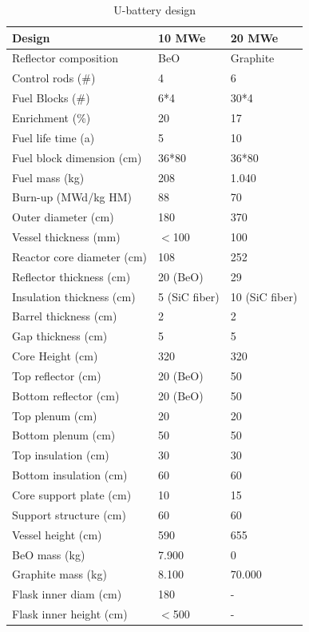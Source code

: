 \begin{table} [htbp]
\begin{center}
\caption{U-battery design}
\label{Utable}
\begin{tabular}{l l l}
\hline 
Design 		&10 MWe &20 MWe\\ 
\hline 
Reflector composition & BeO          &  Graphite\\
Control rods (\#) & 4                        &  6 \\
Fuel Blocks (\#) & 6*4                     & 30*4 \\
Enrichment (\%) & 20                      & 17  \\
Fuel life time (a)&  5                       & 10  \\
Fuel block dimension (cm) & 36*80 &  36*80 \\
Fuel mass (kg) & 208                     &   1.040\\
Burn-up (MWd/kg HM)  & 88           &   70 \\
\hline 
Outer diameter (cm)             &   180  &  370   \\
Vessel thickness (mm)        &   $<$100       & 100   \\
Reactor core diameter (cm)  &   108     &  252  \\
Reflector thickness (cm)      &   20 (BeO)    &29    \\
Insulation thickness (cm)     &   5 (SiC fiber)     & 10 (SiC fiber)   \\
Barrel thickness (cm)           &    2   & 2    \\
Gap thickness (cm)             &    5  &  5  \\
\hline 
Core Height (cm)          & 320         & 320 \\
Top reflector (cm)         &  20 (BeO)&50  \\
Bottom reflector (cm)    &  20 (BeO)& 50 \\
Top plenum (cm)          &20            &20  \\
Bottom plenum (cm)     &  50          &50  \\
Top insulation (cm)       &30           &30 \\
Bottom insulation (cm)  &  60         &60 \\
Core support plate (cm) &  10         &15  \\
Support structure (cm)  &   60         &60  \\
Vessel height (cm)       & 590         &655  \\
\hline 
BeO mass (kg) &    7.900       &0  \\
Graphite mass (kg) &   8.100        & 70.000  \\
Flask inner diam (cm)& 180       & - \\
Flask inner height (cm)& $<$500         & - \\
\hline 

\end{tabular}
\end{center}
\end{table}



